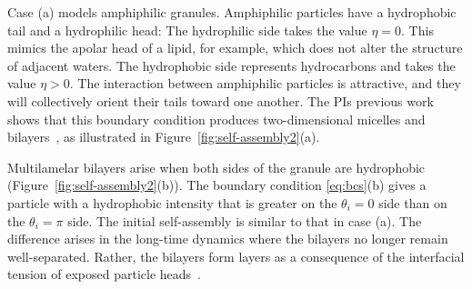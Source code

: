 Case (a) models amphiphilic granules.
Amphiphilic particles have a hydrophobic tail and a hydrophilic head: The hydrophilic side takes the value $\eta =0$.
This mimics the apolar head of a lipid, for example, which does
not alter the structure of adjacent waters. The hydrophobic side
represents hydrocarbons and takes the value 
$\eta > 0$. The interaction between amphiphilic particles is attractive,
and they will collectively orient their tails toward
one another. 
The PIs previous work shows that this   
boundary condition produces two-dimensional micelles and
bilayers~\cite{Fu2018_SIAM}, as illustrated in 
Figure~\ref{fig:self-assembly2}(a).


Multilamelar bilayers arise when both sides of the granule
are hydrophobic (Figure~\ref{fig:self-assembly2}(b)).
The boundary condition \eqref{eq:bcs}(b) 
gives a particle with a hydrophobic intensity that is greater
on the $\theta_i = 0$ side than on the $\theta_i = \pi$ side.
The initial self-assembly is similar to that in case (a).
The difference arises in the long-time dynamics where the bilayers
no longer remain well-separated. 
Rather, the bilayers form layers 
as a consequence of the interfacial tension of exposed particle
heads~\cite{Huetal19, deMeetal21}. 

